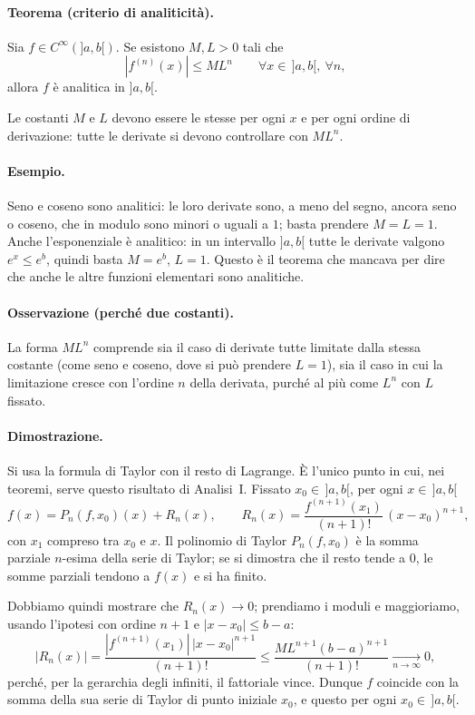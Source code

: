 \paragraph{Teorema (criterio di analiticità).}
Sia $f\in C^\infty(]a,b[)$. Se esistono $M,L>0$ tali che
\[
  |f^{(n)}(x)| \le M L^n \qquad \forall x\in\,]a,b[,\ \forall n,
\]
allora $f$ è analitica in $]a,b[$.

Le costanti $M$ e $L$ devono essere le stesse per ogni $x$ e per ogni ordine di derivazione: tutte le derivate
si devono controllare con $M L^n$.

\paragraph{Esempio.}
Seno e coseno sono analitici: le loro derivate sono, a meno del segno, ancora seno o coseno, che in modulo sono
minori o uguali a $1$; basta prendere $M=L=1$. Anche l'esponenziale è analitico: in un intervallo $]a,b[$ tutte
le derivate valgono $e^x \le e^b$, quindi basta $M=e^b$, $L=1$.
Questo è il teorema che mancava per dire che anche le altre funzioni elementari sono analitiche.

\paragraph{Osservazione (perché due costanti).}
La forma $M L^n$ comprende sia il caso di derivate tutte limitate dalla stessa costante (come seno e coseno, dove
si può prendere $L=1$), sia il caso in cui la limitazione cresce con l'ordine $n$ della derivata, purché al più
come $L^n$ con $L$ fissato.

\paragraph{Dimostrazione.}
Si usa la formula di Taylor con il resto di Lagrange.
È l'unico punto in cui, nei teoremi, serve questo risultato di Analisi~I.
Fissato $x_0\in\,]a,b[$, per ogni $x\in\,]a,b[$
\[
  f(x) = P_n(f,x_0)(x) + R_n(x),
  \qquad
  R_n(x) = \frac{f^{(n+1)}(x_1)}{(n+1)!}\,(x-x_0)^{n+1},
\]
con $x_1$ compreso tra $x_0$ e $x$.
Il polinomio di Taylor $P_n(f,x_0)$ è la somma parziale $n$-esima della serie di Taylor; se si dimostra che il resto
tende a $0$, le somme parziali tendono a $f(x)$ e si ha finito.

Dobbiamo quindi mostrare che $R_n(x)\to0$; prendiamo i moduli e maggioriamo, usando l'ipotesi con ordine $n+1$
e $|x-x_0|\le b-a$:
\[
  |R_n(x)| = \frac{|f^{(n+1)}(x_1)|\,|x-x_0|^{n+1}}{(n+1)!}
  \le \frac{M L^{n+1} (b-a)^{n+1}}{(n+1)!} \xrightarrow[n\to\infty]{} 0 ,
\]
perché, per la gerarchia degli infiniti, il fattoriale vince. Dunque $f$ coincide con la somma della sua serie
di Taylor di punto iniziale $x_0$, e questo per ogni $x_0\in\,]a,b[$.

